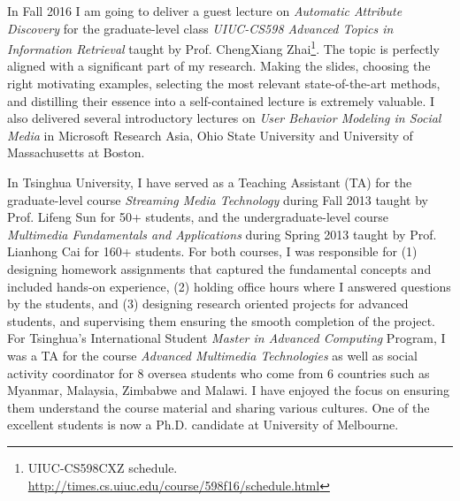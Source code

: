 \documentclass[10.5pt]{article}
\begin{document}
In Fall 2016 I am going to deliver a guest lecture on \textit{Automatic Attribute Discovery} for the graduate-level class \textit{UIUC-CS598 Advanced Topics in Information Retrieval} taught by Prof. ChengXiang Zhai\footnote{UIUC-CS598CXZ schedule. \url{http://times.cs.uiuc.edu/course/598f16/schedule.html}}. The topic is perfectly aligned with a significant part of my research. Making the slides, choosing the right motivating examples, selecting the most relevant state-of-the-art methods, and distilling their essence into a self-contained lecture is extremely valuable. I also delivered several introductory lectures on \textit{User Behavior Modeling in Social Media} in Microsoft Research Asia, Ohio State University and University of Massachusetts at Boston.

\vskip 0.06in
\vskip 0.02in

In Tsinghua University, I have served as a Teaching Assistant (TA) for the graduate-level course \textit{Streaming Media Technology} during Fall 2013 taught by Prof. Lifeng Sun for 50+ students, and the undergraduate-level course \textit{Multimedia Fundamentals and Applications} during Spring 2013 taught by Prof. Lianhong Cai for 160+ students. For both courses, I was responsible for (1) designing homework assignments that captured the fundamental concepts and included hands-on experience, (2) holding office hours where I answered questions by the students, and (3) designing research oriented projects for advanced students, and supervising them ensuring the smooth completion of the project. For Tsinghua's International Student \textit{Master in Advanced Computing} Program, I was a TA for the course \textit{Advanced Multimedia Technologies} as well as social activity coordinator for 8 oversea students who come from 6 countries such as Myanmar, Malaysia, Zimbabwe and Malawi. I have enjoyed the focus on ensuring them understand the course material and sharing various cultures. One of the excellent students is now a Ph.D. candidate at University of Melbourne.

\vskip 0.06in
\vskip 0.02in
\end{document}
